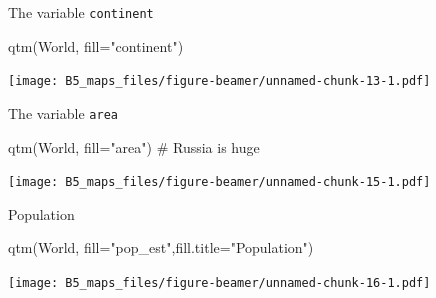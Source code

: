 \documentclass[
  10pt,
  ignorenonframetext,
]{beamer}
\newenvironment{Shaded}{\begin{snugshade}}{\end{snugshade}}
\newcommand{\CommentTok}[1]{\textcolor[rgb]{0.50,0.62,0.50}{#1}}
\newcommand{\DataTypeTok}[1]{\textcolor[rgb]{0.87,0.87,0.75}{#1}}
\newcommand{\KeywordTok}[1]{\textcolor[rgb]{0.94,0.87,0.69}{#1}}
\newcommand{\NormalTok}[1]{\textcolor[rgb]{0.80,0.80,0.80}{#1}}
\newcommand{\StringTok}[1]{\textcolor[rgb]{0.80,0.58,0.58}{#1}}
\begin{document}
\begin{frame}[fragile]{The variable \texttt{continent}}
\protect\hypertarget{the-variable-continent}{}

\begin{Shaded}
\begin{Highlighting}[]
\KeywordTok{qtm}\NormalTok{(World, }\DataTypeTok{fill=}\StringTok{"continent"}\NormalTok{)}
\end{Highlighting}
\end{Shaded}

\texttt{[image: B5\_maps\_files/figure-beamer/unnamed-chunk-13-1.pdf]}

\end{frame}

\begin{frame}[fragile]{The variable \texttt{area}}
\protect\hypertarget{the-variable-area}{}

\begin{Shaded}
\begin{Highlighting}[]
\KeywordTok{qtm}\NormalTok{(World, }\DataTypeTok{fill=}\StringTok{"area"}\NormalTok{) }\CommentTok{# Russia is huge}
\end{Highlighting}
\end{Shaded}

\texttt{[image: B5\_maps\_files/figure-beamer/unnamed-chunk-15-1.pdf]}

\end{frame}

\begin{frame}[fragile]{Population}
\protect\hypertarget{population-1}{}

\begin{Shaded}
\begin{Highlighting}[]
\KeywordTok{qtm}\NormalTok{(World, }\DataTypeTok{fill=}\StringTok{"pop_est"}\NormalTok{,}\DataTypeTok{fill.title=}\StringTok{"Population"}\NormalTok{) }
\end{Highlighting}
\end{Shaded}

\texttt{[image: B5\_maps\_files/figure-beamer/unnamed-chunk-16-1.pdf]}

\end{frame}
\end{document}
